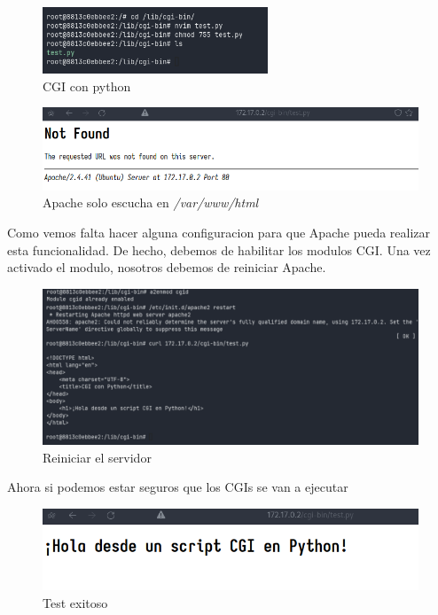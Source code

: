 \begin{figure}[H]
  \centering
  \includegraphics[width=0.6\textwidth]{img/cgi_with_python.png}
  \caption{CGI con python}
\end{figure}

\begin{figure}[H]
  \centering
  \includegraphics[width=1.0\textwidth]{img/test_error.png}
  \caption{Apache solo escucha en \textit{/var/www/html}}
\end{figure}

Como vemos falta hacer alguna configuracion para que Apache pueda realizar esta funcionalidad. De hecho, 
debemos de habilitar los modulos CGI. Una vez activado el modulo, nosotros debemos de reiniciar Apache.

\begin{figure}[H]
  \centering
  \includegraphics[width=1.0\textwidth]{img/restart.png}
  \caption{Reiniciar el servidor}
\end{figure}

Ahora si podemos estar seguros que los CGIs se van a ejecutar

\begin{figure}[H]
  \centering
  \includegraphics[width=1.0\textwidth]{img/test.png}
  \caption{Test exitoso}
\end{figure}

